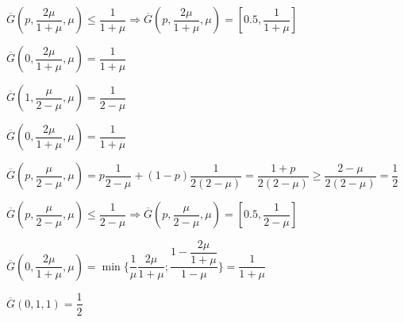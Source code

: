 $
	\overline G(p, \dfrac{2\mu}{1 + \mu}, \mu) \leqslant 
	\dfrac{1}{1 + \mu} \Rightarrow
	\overline G (p, \dfrac{2\mu}{1 + \mu}, \mu) = 
	[0.5, 	\dfrac{1}{1 + \mu}]
$

$
	\overline G(0, \dfrac{2\mu}{1 + \mu}, \mu) = 
	\dfrac{1}{1 + \mu}
$

$
	\overline G(1, \dfrac{\mu}{2 - \mu}, \mu) = 
	\dfrac{1}{2 - \mu}
$

$
	\overline G(0, \dfrac{2\mu}{1 + \mu}, \mu) = 
	\dfrac{1}{1 + \mu}
$

$
	\overline G(p, \dfrac{\mu}{2 - \mu}, \mu) =
	p\dfrac{1}{2 - \mu} + (1 - p)\dfrac{1}{2(2 - \mu)} =
	\dfrac{1 + p}{2(2 - \mu)} \geqslant 
	\dfrac{2 - \mu}{2(2 - \mu)} =
	\dfrac{1}{2}
$

$
	\overline G(p, \dfrac{\mu}{2 - \mu}, \mu) \leqslant
 	\dfrac{1}{2 - \mu} \Rightarrow 
 	\overline G(p, \dfrac{\mu}{2 - \mu}, \mu) =
 	[0.5, \dfrac{1}{2 - \mu}]
$

$
	\overline G(0, \dfrac{2\mu}{1 + \mu}, \mu)=
	\min \big\{
		\dfrac{1}{\mu}\dfrac{2\mu}{1 + \mu}; 
		\dfrac{1 - \dfrac{2\mu}{1 + \mu}}{1 - \mu}
	\big\} =
	\dfrac{1}{1 + \mu}
$

$
	\overline G(0, 1, 1) = \dfrac{1}{2}
$